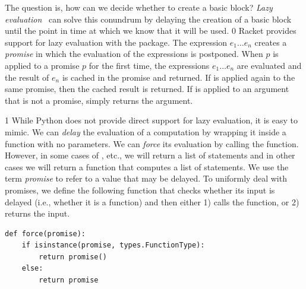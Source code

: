 \documentclass[7x10]{TimesAPriori_MIT}%
\def\racketEd{0}
\def\pythonEd{1}
\def\edition{0}
\numberwithin{theorem}{chapter}
\numberwithin{definition}{chapter}
\numberwithin{equation}{chapter}
\begin{document}
The question is, how can we decide whether to create a basic block?
\emph{Lazy evaluation}~\citep{Friedman:1976aa} can solve this conundrum by
delaying the creation of a basic block until the point in time at which
we know that it will be used.
%
{\if\edition\racketEd
%
Racket provides support for
lazy evaluation with the
\href{https://docs.racket-lang.org/reference/Delayed_Evaluation.html}{}
package. The expression  $e_1 \ldots e_n$\key{)}
 creates a
\emph{promise} in which the evaluation of the
expressions is postponed. When 
$p$\key{)} is applied to a promise $p$ for the
first time, the expressions $e_1 \ldots e_n$ are evaluated and the
result of $e_n$ is cached in the promise and returned. If 
is applied again to the same promise, then the cached result is
returned.  If  is applied to an argument that is not a
promise,  simply returns the argument.
%
\fi}
%
{\if\edition\pythonEd
%
While Python does not provide direct support for lazy evaluation, it
is easy to mimic. We can \emph{delay} the evaluation of a computation
by wrapping it inside a function with no parameters. We can
\emph{force} its evaluation by calling the function. However, in some
cases of , etc., we will return a list of
statements and in other cases we will return a function that computes
a list of statements. We use the term \emph{promise} to refer to a
value that may be delayed.  To uniformly deal with
promises, we define the following  function that checks
whether its input is delayed (i.e., whether it is a function) and then
either 1) calls the function, or 2) returns the input.
\begin{lstlisting}
def force(promise):
    if isinstance(promise, types.FunctionType):
        return promise()
    else:
        return promise
\end{lstlisting}
%
\fi}
\end{document}
